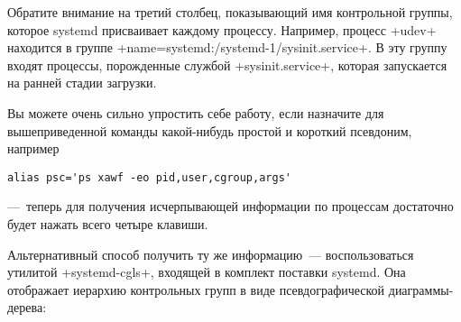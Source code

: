 \documentclass[10pt,oneside,a4paper]{article}
\begin{document}
Обратите внимание на третий столбец, показывающий имя контрольной группы,
которое systemd присваивает каждому процессу. Например, процесс +udev+
находится в группе +name=systemd:/systemd-1/sysinit.service+. В эту группу
входят процессы, порожденные службой +sysinit.service+, которая запускается
на ранней стадии загрузки.

Вы можете очень сильно упростить себе работу, если назначите для
вышеприведенной команды какой-нибудь простой и короткий псевдоним, например 
\begin{Verbatim}
alias psc='ps xawf -eo pid,user,cgroup,args'
\end{Verbatim}
---~теперь для получения исчерпывающей информации по процессам достаточно будет
нажать всего четыре клавиши.

Альтернативный способ получить ту же информацию~--- воспользоваться утилитой
+systemd-cgls+, входящей в комплект поставки systemd. Она отображает иерархию
контрольных групп в виде псевдографической диаграммы-дерева: 
\end{document}
